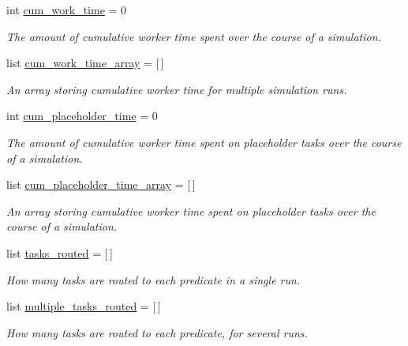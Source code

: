 \begin{DoxyCompactItemize}
int \mbox{\hyperlink{classdynamicfilterapp_1_1test__simulations_1_1_simulation_test_a3bb2bc391dd71366cb5923135d4e9bfd}{cum\+\_\+work\+\_\+time}} = 0
\begin{DoxyCompactList}\small\item\em The amount of cumulative worker time spent over the course of a simulation. \end{DoxyCompactList}\item 
list \mbox{\hyperlink{classdynamicfilterapp_1_1test__simulations_1_1_simulation_test_a7649734a340929740a348ac52178ff96}{cum\+\_\+work\+\_\+time\+\_\+array}} = \mbox{[}$\,$\mbox{]}
\begin{DoxyCompactList}\small\item\em An array storing cumulative worker time for multiple simulation runs. \end{DoxyCompactList}\item 
int \mbox{\hyperlink{classdynamicfilterapp_1_1test__simulations_1_1_simulation_test_ad624910d290a0fbde1a5c6162997cf34}{cum\+\_\+placeholder\+\_\+time}} = 0
\begin{DoxyCompactList}\small\item\em The amount of cumulative worker time spent on placeholder tasks over the course of a simulation. \end{DoxyCompactList}\item 
list \mbox{\hyperlink{classdynamicfilterapp_1_1test__simulations_1_1_simulation_test_a501a8c79bce178354e4229610109e71d}{cum\+\_\+placeholder\+\_\+time\+\_\+array}} = \mbox{[}$\,$\mbox{]}
\begin{DoxyCompactList}\small\item\em An array storing cumulative worker time spent on placeholder tasks over the course of a simulation. \end{DoxyCompactList}\item 
list \mbox{\hyperlink{classdynamicfilterapp_1_1test__simulations_1_1_simulation_test_aab2fc3f0d608ab6bc5deb305f3027959}{tasks\+\_\+routed}} = \mbox{[}$\,$\mbox{]}
\begin{DoxyCompactList}\small\item\em How many tasks are routed to each predicate in a single run. \end{DoxyCompactList}\item 
list \mbox{\hyperlink{classdynamicfilterapp_1_1test__simulations_1_1_simulation_test_aa9725b777265410b69964ff9abbf3559}{multiple\+\_\+tasks\+\_\+routed}} = \mbox{[}$\,$\mbox{]}
\begin{DoxyCompactList}\small\item\em How many tasks are routed to each predicate, for several runs. \end{DoxyCompactList}\item 

\end{DoxyCompactItemize}
